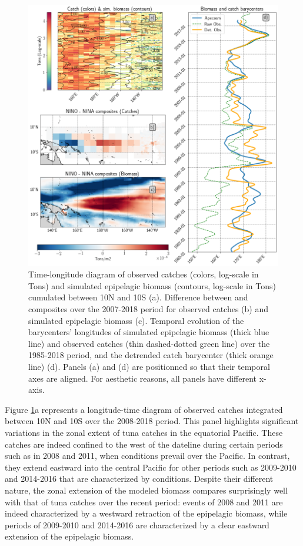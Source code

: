 \begin{figure}[h!tp]
	\centering
	\includegraphics[scale=0.4]{figs/plot_validation_apecosm.png}
	\caption{Time-longitude diagram of observed catches (colors, log-scale in Tons) and simulated epipelagic biomass (contours, log-scale in Tons) cumulated between 10\degree{}N and 10\degree{}S (a). Difference between \nino{} and \nina{} composites over the 2007-2018 period for observed catches (b) and simulated epipelagic biomass (c). Temporal evolution of the barycenters' longitudes of simulated epipelagic biomass (thick blue line) and observed catches (thin dashed-dotted green line) over the 1985-2018 period, and the detrended catch barycenter (thick orange line) (d). Panels (a) and (d) are positionned so that their temporal axes are aligned. For aesthetic reasons, all panels have different x-axis.}
	\label{fig:apecosm_validation}
\end{figure}


Figure \ref{fig:apecosm_validation}a represents a longitude-time diagram of observed catches integrated between 10\degree{}N and 10\degree{}S over the 2008-2018 period. This panel highlights significant variations in the zonal extent of tuna catches in the equatorial Pacific. These catches are indeed confined to the west of the dateline during certain periods such as in 2008 and 2011, when \nina{} conditions prevail over the Pacific. In contrast, they extend eastward into the central Pacific for other periods such as 2009-2010 and 2014-2016 that are characterized by \nino{} conditions. Despite their different nature, the zonal extension of the modeled biomass compares surprisingly well with that of tuna catches over the recent period: \nina{} events of 2008 and 2011 are indeed characterized by a westward retraction of the epipelagic biomass, while \nino{} periods of 2009-2010 and 2014-2016 are characterized by a clear eastward extension of the epipelagic biomass. 

